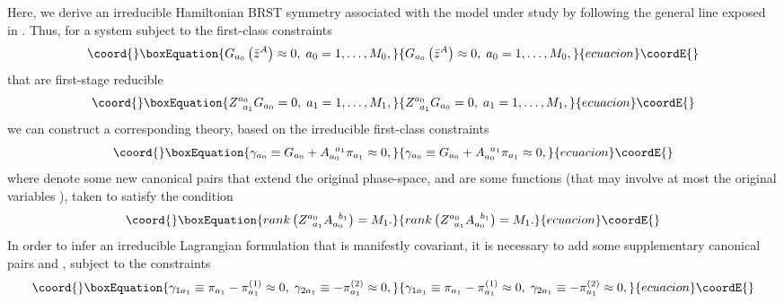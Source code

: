 \documentclass[a4paper,12pt]{article}
\begin{document}
Here, we derive an irreducible Hamiltonian BRST symmetry associated with the
model under study by following the general line exposed in \cite{24}. Thus,
for a system subject to the first-class constraints 
\begin{equation}\coord{}\boxEquation{
G_{a_{0}}\left( \bar{z}^{A}\right) \approx 0,\;a_{0}=1,\ldots ,M_{0},
\label{11x}
}{
G_{a_{0}}\left( \bar{z}^{A}\right) \approx 0,\;a_{0}=1,\ldots ,M_{0},
}{ecuacion}\coordE{}\end{equation}
that are first-stage reducible 
\begin{equation}\coord{}\boxEquation{
Z_{\;\;a_{1}}^{a_{0}}G_{a_{0}}=0,\;a_{1}=1,\ldots ,M_{1},  \label{11y}
}{
Z_{\;\;a_{1}}^{a_{0}}G_{a_{0}}=0,\;a_{1}=1,\ldots ,M_{1},  }{ecuacion}\coordE{}\end{equation}
we can construct a corresponding theory, based on the irreducible
first-class constraints 
\begin{equation}\coord{}\boxEquation{
\gamma _{a_{0}}\equiv G_{a_{0}}+A_{a_{0}}^{\;\;a_{1}}\pi _{a_{1}}\approx 0,
\label{11z}
}{
\gamma _{a_{0}}\equiv G_{a_{0}}+A_{a_{0}}^{\;\;a_{1}}\pi _{a_{1}}\approx 0,
}{ecuacion}\coordE{}\end{equation}
where \coordHE{} denote some new canonical
pairs that extend the original phase-space, and \coordHE{} are
some functions (that may involve at most the original variables \coordHE{}%
), taken to satisfy the condition 
\begin{equation}\coord{}\boxEquation{
rank\left( Z_{\;\;a_{1}}^{a_{0}}A_{a_{0}}^{\;\;b_{1}}\right) =M_{1}.
\label{11xy}
}{
rank\left( Z_{\;\;a_{1}}^{a_{0}}A_{a_{0}}^{\;\;b_{1}}\right) =M_{1}.
}{ecuacion}\coordE{}\end{equation}
In order to infer an irreducible Lagrangian formulation that is manifestly
covariant, it is necessary to add some supplementary canonical pairs \coordHE{} and \coordHE{},
subject to the constraints 
\begin{equation}\coord{}\boxEquation{
\gamma _{1a_{1}}\equiv \pi _{a_{1}}-\pi _{a_{1}}^{\left( 1\right) }\approx
0,\;\gamma _{2a_{1}}\equiv -\pi _{a_{1}}^{\left( 2\right) }\approx 0,
\label{11xz}
}{
\gamma _{1a_{1}}\equiv \pi _{a_{1}}-\pi _{a_{1}}^{\left( 1\right) }\approx
0,\;\gamma _{2a_{1}}\equiv -\pi _{a_{1}}^{\left( 2\right) }\approx 0,
}{ecuacion}\coordE{}\end{equation}
\end{document}
